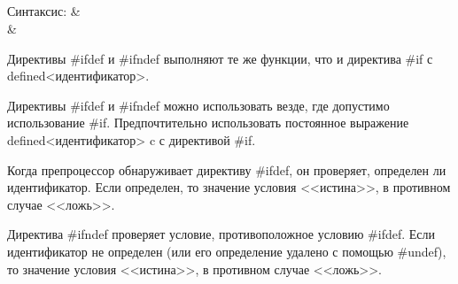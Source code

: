 \subsection{}

\begin{pHeader}
Синтаксис: & \\
           & \\         
\end{pHeader}

Директивы \#ifdef и \#ifndef выполняют те же функции, что и директива \#if с defined<идентификатор>. \killoverfullbefore

Директивы \#ifdef и \#ifndef можно использовать везде, где допустимо использование \#if. Предпочтительно использовать постоянное выражение defined<идентификатор> c с директивой \#if. \killoverfullbefore

Когда препроцессор обнаруживает директиву \#ifdef, он проверяет, определен ли идентификатор. Если определен, то значение условия <<истина>>, в противном случае <<ложь>>. \killoverfullbefore

Директива \#ifndef проверяет условие, противоположное условию \#ifdef. Если идентификатор не определен (или его определение удалено с помощью \#undef), то значение условия <<истина>>, в противном случае <<ложь>>. \killoverfullbefore



\clearpage